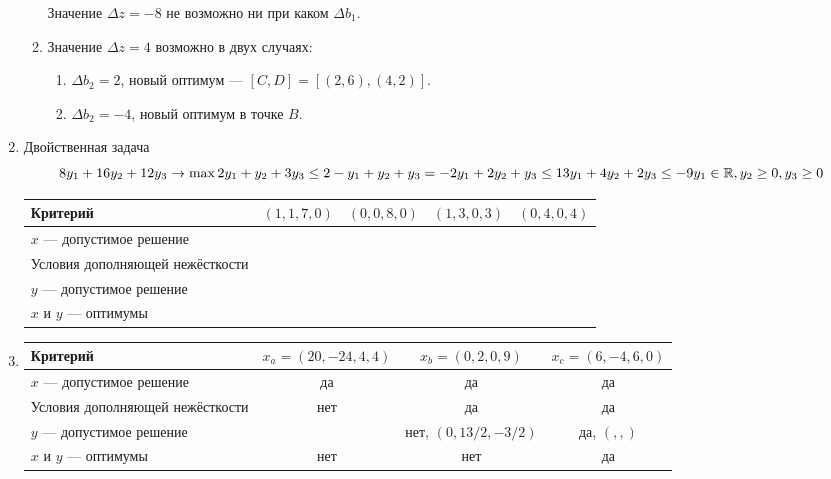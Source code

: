 \documentclass[12pt]{article}
\newcommand \RR{\mathbb{R}}
\begin{document}
\begin{enumerate}
\begin{enumerate}
Значение $\Delta z = -8$ не возможно ни при каком $\Delta b_1$.

\item Значение $\Delta z = 4$ возможно в двух случаях:
\begin{enumerate}
  \item $\Delta b_2 = 2$, новый оптимум — $[C, D] = [(2, 6), (4, 2)]$.
  \item $\Delta b_2 = -4$, новый оптимум в точке $B$.
\end{enumerate}

\end{enumerate}

\item %

Двойственная задача 
\[
  8y_1 + 16 y_2 + 12 y_3 \to \max \\
  2y_1 + y_2 + 3y_3 \leq 2 \\
  -y_1 + y_2 + y_3 = - 2 \\ 
  y_1 + 2y_2 + y_3 \leq 1 \\
  3y_1 + 4 y_2 + 2 y_3 \leq -9 \\
  y_1 \in \RR, y_2 \geq 0, y_3 \geq 0 \\
\]

\begin{tabular}{lcccc}
  Критерий & $(1, 1, 7, 0)$ & $(0, 0, 8, 0)$ & $(1, 3, 0, 3)$ & $(0, 4, 0, 4)$ \\
  \midrule
  $x$ — допустимое решение &  & &  & \\
  Условия дополняющей нежёсткости &  &  &  & \\
  $y$ — допустимое решение & & & & \\
  $x$ и $y$ — оптимумы &  &  & & \\
\end{tabular}


\item %

\begin{tabular}{lccc}
  Критерий & $x_a = (20, -24, 4, 4)$ & $x_b = (0, 2, 0, 9)$ & $x_c = (6, -4, 6, 0)$ \\
  \midrule
  $x$ — допустимое решение & да & да & да \\
  Условия дополняющей нежёсткости & нет & да & да \\
  $y$ — допустимое решение & & нет, $(0, 13/2, -3/2)$ & да, $(,,)$ \\
  $x$ и $y$ — оптимумы & нет & нет & да \\
\end{tabular}


\end{enumerate}
\end{document}
